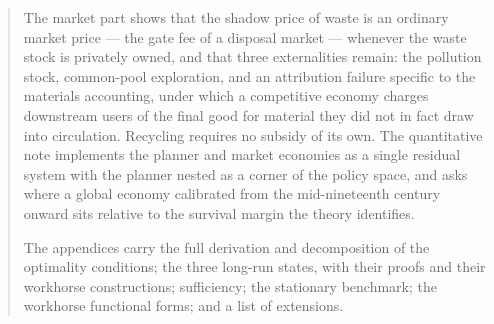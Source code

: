\begin{abstract}
The market part shows that the shadow price of waste is an ordinary market price --- the gate fee of a disposal market --- whenever the waste stock is privately owned, and that three externalities remain: the pollution stock, common-pool exploration, and an attribution failure specific to the materials accounting, under which a competitive economy charges downstream users of the final good for material they did not in fact draw into circulation. Recycling requires no subsidy of its own. The quantitative note implements the planner and market economies as a single residual system with the planner nested as a corner of the policy space, and asks where a global economy calibrated from the mid-nineteenth century onward sits relative to the survival margin the theory identifies.


The appendices carry the full derivation and decomposition of the optimality conditions; the three long-run states, with their proofs and their workhorse constructions; sufficiency; the stationary benchmark; the workhorse functional forms; and a list of extensions.
\end{abstract}
